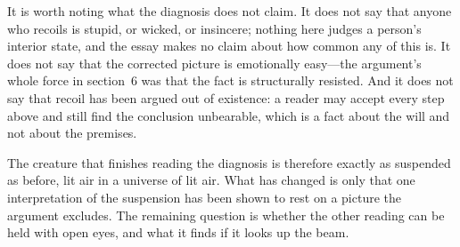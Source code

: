 It is worth noting what the diagnosis does not claim. It does not say that anyone who recoils is stupid, or wicked, or insincere; nothing here judges a person's interior state, and the essay makes no claim about how common any of this is. It does not say that the corrected picture is emotionally easy---the argument's whole force in section~6 was that the fact is structurally resisted. And it does not say that recoil has been argued out of existence: a reader may accept every step above and still find the conclusion unbearable, which is a fact about the will and not about the premises.

The creature that finishes reading the diagnosis is therefore exactly as suspended as before, lit air in a universe of lit air. What has changed is only that one interpretation of the suspension has been shown to rest on a picture the argument excludes. The remaining question is whether the other reading can be held with open eyes, and what it finds if it looks up the beam.

